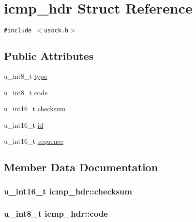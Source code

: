 \hypertarget{structicmp__hdr}{
\section{icmp\_\-hdr Struct Reference}
\label{structicmp__hdr}
}
{\tt \#include $<$usock.h$>$}

\subsection*{Public Attributes}
\begin{CompactItemize}
\item 
u\_\-int8\_\-t \hyperlink{structicmp__hdr_054d3b022febf3b05f1ddb9dd906dbfa}{type}
\item 
u\_\-int8\_\-t \hyperlink{structicmp__hdr_20c797dc348a3a620929169f5637515f}{code}
\item 
u\_\-int16\_\-t \hyperlink{structicmp__hdr_adfc592902141c82e5feda1c26c8f1cc}{checksum}
\item 
u\_\-int16\_\-t \hyperlink{structicmp__hdr_8ceada44796f077ba4398312b65aa6e5}{id}
\item 
u\_\-int16\_\-t \hyperlink{structicmp__hdr_747445ef1c8275eccce121fd1a5f5b90}{sequence}
\end{CompactItemize}


\subsection{Member Data Documentation}
\hypertarget{structicmp__hdr_adfc592902141c82e5feda1c26c8f1cc}{
\subsubsection[{checksum}]{\setlength{\rightskip}{0pt plus 5cm}u\_\-int16\_\-t {\bf icmp\_\-hdr::checksum}}}
\label{structicmp__hdr_adfc592902141c82e5feda1c26c8f1cc}


\hypertarget{structicmp__hdr_20c797dc348a3a620929169f5637515f}{
\subsubsection[{code}]{\setlength{\rightskip}{0pt plus 5cm}u\_\-int8\_\-t {\bf icmp\_\-hdr::code}}}
\label{structicmp__hdr_20c797dc348a3a620929169f5637515f}


